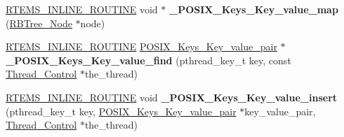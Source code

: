 \begin{DoxyCompactItemize}
\mbox{\label{group__POSIX__KEY_gacf7159b40b6fc12570301587e5ea31b5}} 
\mbox{\hyperlink{group__RTEMSScoreBaseDefs_gac216239df231d5dbd15e3520b0b9313f}{R\+T\+E\+M\+S\+\_\+\+I\+N\+L\+I\+N\+E\+\_\+\+R\+O\+U\+T\+I\+NE}} void $\ast$ {\bfseries \+\_\+\+P\+O\+S\+I\+X\+\_\+\+Keys\+\_\+\+Key\+\_\+value\+\_\+map} (\mbox{\hyperlink{structRBTree__Node}{R\+B\+Tree\+\_\+\+Node}} $\ast$node)
\item 
\mbox{\label{group__POSIX__KEY_gaa878f1521857ae9e0e59813cd92f9946}} 
\mbox{\hyperlink{group__RTEMSScoreBaseDefs_gac216239df231d5dbd15e3520b0b9313f}{R\+T\+E\+M\+S\+\_\+\+I\+N\+L\+I\+N\+E\+\_\+\+R\+O\+U\+T\+I\+NE}} \mbox{\hyperlink{structPOSIX__Keys__Key__value__pair}{P\+O\+S\+I\+X\+\_\+\+Keys\+\_\+\+Key\+\_\+value\+\_\+pair}} $\ast$ {\bfseries \+\_\+\+P\+O\+S\+I\+X\+\_\+\+Keys\+\_\+\+Key\+\_\+value\+\_\+find} (pthread\+\_\+key\+\_\+t key, const \mbox{\hyperlink{struct__Thread__Control}{Thread\+\_\+\+Control}} $\ast$the\+\_\+thread)
\item 
\mbox{\label{group__POSIX__KEY_ga94ff63515207ef269dffd4e34232a6fd}} 
\mbox{\hyperlink{group__RTEMSScoreBaseDefs_gac216239df231d5dbd15e3520b0b9313f}{R\+T\+E\+M\+S\+\_\+\+I\+N\+L\+I\+N\+E\+\_\+\+R\+O\+U\+T\+I\+NE}} void {\bfseries \+\_\+\+P\+O\+S\+I\+X\+\_\+\+Keys\+\_\+\+Key\+\_\+value\+\_\+insert} (pthread\+\_\+key\+\_\+t key, \mbox{\hyperlink{structPOSIX__Keys__Key__value__pair}{P\+O\+S\+I\+X\+\_\+\+Keys\+\_\+\+Key\+\_\+value\+\_\+pair}} $\ast$key\+\_\+value\+\_\+pair, \mbox{\hyperlink{struct__Thread__Control}{Thread\+\_\+\+Control}} $\ast$the\+\_\+thread)
\end{DoxyCompactItemize}
